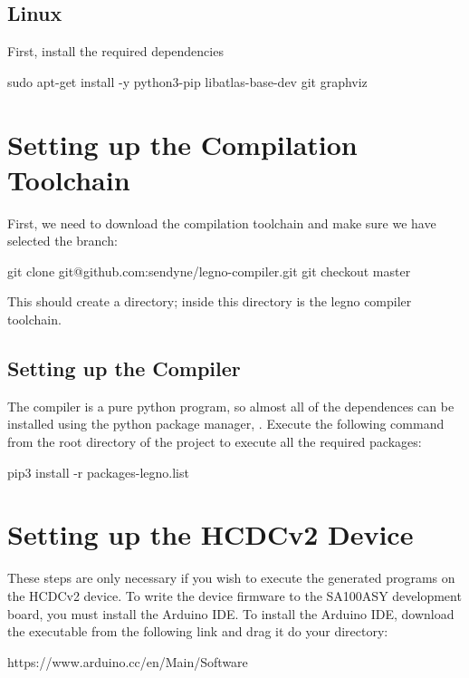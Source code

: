 \subsection{Linux}

First, install the required dependencies

\begin{snippet}
sudo apt-get install -y python3-pip libatlas-base-dev git graphviz
\end{snippet}

\section{Setting up the Compilation Toolchain}


First, we need to download the compilation toolchain and make sure we have
selected the  branch:

\begin{snippet}
  git clone git@github.com:sendyne/legno-compiler.git
  git checkout master
\end{snippet}

This should create a  directory; inside this directory is the
legno compiler toolchain.

\subsection{Setting up the Compiler}
The compiler is a pure python program, so almost all of the dependences can be
installed using the python package manager, . Execute the following command
from the root directory of the  project to execute all the required packages:

\begin{snippet}
  pip3 install -r packages-legno.list
\end{snippet}

\section{Setting up the HCDCv2 Device}
These steps are only necessary if you wish to execute the generated programs on
the HCDCv2 device. To write the device firmware to the SA100ASY development
board, you must install the Arduino IDE. To install the Arduino IDE, download
the executable from the following link and drag it do your  directory:

\begin{snippet}
https://www.arduino.cc/en/Main/Software
\end{snippet}

